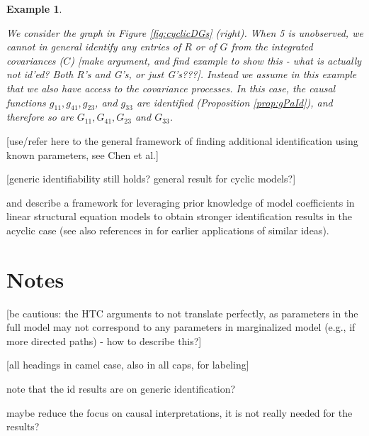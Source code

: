 \documentclass[accepted]{uai2021} %
\newtheorem{exmp}[thm]{Example}
\begin{document}
\begin{exmp}
\begin{figure*}
\begin{subfigure}{0.48\linewidth}
\begin{tikzpicture}[scale=0.7]
			
			\end{tikzpicture}
		\end{subfigure}
		\caption{\label{fig:cyclicDGs} Loops (self-edges) are omitted from this 
		vizualiation. Circles represent observed coordinate processes and 
		squares represent unobserved processes. Left: . Right: }
	\end{figure*}
	
	We consider the graph in Figure \ref{fig:cyclicDGs} (right). When 5 is 
	unobserved, we cannot in general identify any entries of $R$ or of $G$ from 
	the integrated covariances ($C$) [make argument, and find example to show 
	this - what is actually not id'ed? Both R's and G's, or just G's???]. 
	Instead we assume in this example that we also have access to the 
	covariance processes. In this case, the causal functions 
	$g_{11},g_{41},g_{23}$, and $g_{33}$ are identified (Proposition 
	\ref{prop:gPaId}), and therefore so are $G_{11}, G_{41} , G_{23}$ and 
	$G_{33}$.
\end{exmp}

[use/refer here to the general framework of finding additional identification 
using known parameters, see Chen et al.]

[generic identifiability still holds? general result for cyclic models?]

\cite{chenIJCAI2016} and \cite{chenICML2017} describe a framework for 
leveraging prior knowledge of 
model coefficients in linear structural equation models to obtain stronger 
identification results in the acyclic case (see also references in 
\cite{chenICML2017} for earlier applications of similar ideas).


\section{Notes}

[be cautious: the HTC arguments to not translate perfectly, as parameters in 
the full model may not correspond to any parameters in marginalized model 
(e.g., if more directed paths) - how to describe this?]

[all headings in camel case, also in all caps, for labeling]

note that the id results are on generic identification?

maybe reduce the focus on causal interpretations, it is not really needed for 
the results?

\end{document}
